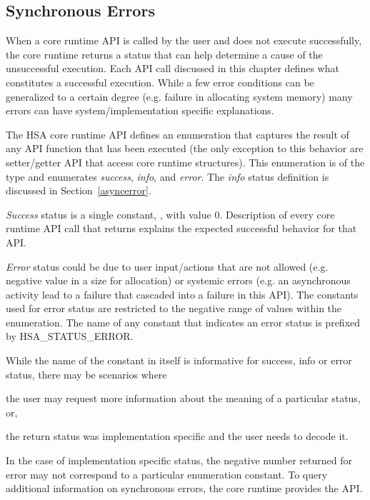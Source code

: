 \documentclass[draft]{book}
\newcommand{\reftyp}[1]{#1}
\newcommand{\refenu}[1]{\reftyp{#1}}
\begin{document}
\hypertarget{syncerror}{}\subsection{Synchronous Errors }\label{syncerror}

When a core runtime API is called by the user and does not execute successfully,
the core runtime returns a status that can help determine a cause of the
unsuccessful execution. Each API call discussed in this chapter defines what
constitutes a successful execution. While a few error conditions can be
generalized to a certain degree (e.g. failure in allocating system memory) many
errors can have system/implementation specific explanations.

The HSA core runtime API defines an enumeration that captures the result of any
API function that has been executed (the only exception to this behavior are
setter/getter API that access core runtime structures). This enumeration is of
the type  and enumerates \textit{success}, \textit{info},
and \textit{error}. The \textit{info} status definition is discussed in
Section~\ref{asyncerror}.

\textit{Success} status is a single constant, ,
with value 0. Description of every core runtime API call that returns
 explains the expected successful behavior for that API.

\textit{Error} status could be due to user input/actions that are not allowed
(e.g. negative value in a size for allocation) or systemic errors (e.g. an
asynchronous activity lead to a failure that cascaded into a failure in this
API). The constants used for error status are restricted to the negative range
of values within the  enumeration. The name of any constant
that indicates an error status is prefixed by \refenu{HSA_STATUS_ERROR}.

While the name of the constant in itself is informative for success, info or
error status, there may be scenarios where\begin{inparaenum}[(i)]\item the user
  may request more information about the meaning of a particular status,
  or, \item the return status was implementation specific and the user needs to
  decode it.
\end{inparaenum} In the case of implementation specific status, the negative
number returned for error may not correspond to a particular enumeration
constant. To query additional information on synchronous errors, the core
runtime provides the  API.
\end{document}
